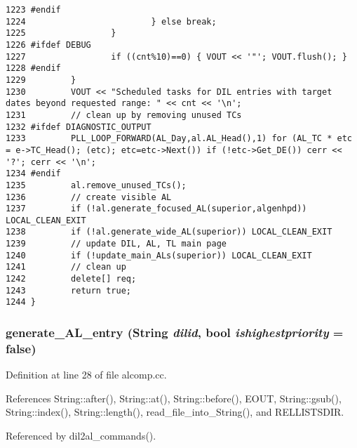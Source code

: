 \begin{verbatim}
1223 #endif
1224                         } else break;
1225                 }
1226 #ifdef DEBUG
1227                 if ((cnt%10)==0) { VOUT << '"'; VOUT.flush(); }
1228 #endif
1229         }
1230         VOUT << "Scheduled tasks for DIL entries with target dates beyond requested range: " << cnt << '\n';
1231         // clean up by removing unused TCs
1232 #ifdef DIAGNOSTIC_OUTPUT
1233         PLL_LOOP_FORWARD(AL_Day,al.AL_Head(),1) for (AL_TC * etc = e->TC_Head(); (etc); etc=etc->Next()) if (!etc->Get_DE()) cerr << '?'; cerr << '\n';
1234 #endif
1235         al.remove_unused_TCs();
1236         // create visible AL
1237         if (!al.generate_focused_AL(superior,algenhpd)) LOCAL_CLEAN_EXIT
1238         if (!al.generate_wide_AL(superior)) LOCAL_CLEAN_EXIT
1239         // update DIL, AL, TL main page
1240         if (!update_main_ALs(superior)) LOCAL_CLEAN_EXIT
1241         // clean up
1242         delete[] req;
1243         return true;
1244 }
\end{verbatim}\normalsize 
{}
\subsubsection{ generate\_\-AL\_\-entry ({\bf String} {\em dilid}, bool {\em ishighestpriority} = {\bf false})}\label{dil2al_8hh_a284}




Definition at line 28 of file alcomp.cc.

References String::after(), String::at(), String::before(), EOUT, String::gsub(), String::index(), String::length(), read\_\-file\_\-into\_\-String(), and RELLISTSDIR.

Referenced by dil2al\_\-commands().



